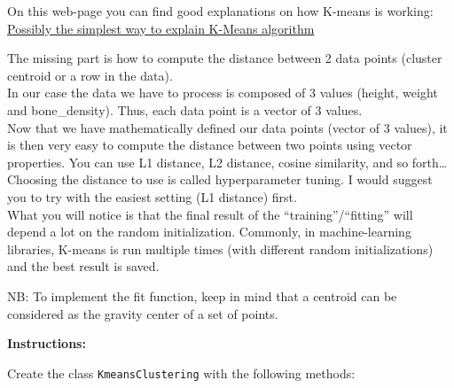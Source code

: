 \documentclass[]{article}
\begin{document}
On this web-page you can find good explanations on how K-means is
working:\\
\href{https://bigdata-madesimple.com/possibly-the-simplest-way-to-explain-k-means-algorithm/}{Possibly
the simplest way to explain K-Means algorithm}

The missing part is how to compute the distance between 2 data points
(cluster centroid or a row in the data).\\
In our case the data we have to process is composed of 3 values (height,
weight and bone\_density). Thus, each data point is a vector of 3
values.\\
Now that we have mathematically defined our data points (vector of 3
values), it is then very easy to compute the distance between two points
using vector properties. You can use L1 distance, L2 distance, cosine
similarity, and so forth\ldots{} Choosing the distance to use is called
hyperparameter tuning. I would suggest you to try with the easiest
setting (L1 distance) first.\\
What you will notice is that the final result of the
``training''/``fitting'' will depend a lot on the random initialization.
Commonly, in machine-learning libraries, K-means is run multiple times
(with different random initializations) and the best result is saved.

NB: To implement the fit function, keep in mind that a centroid can be
considered as the gravity center of a set of points.

\textbf{Instructions:}

Create the class \texttt{KmeansClustering} with the following methods:
\end{document}
